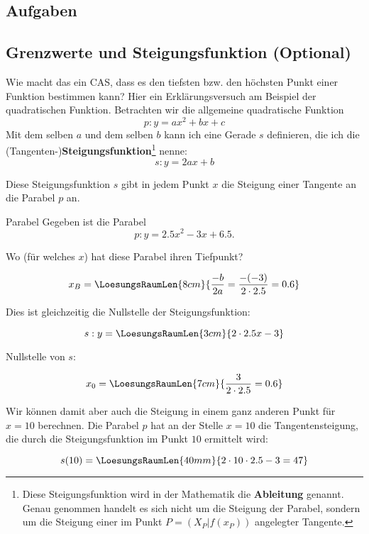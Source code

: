 
\subsection{Aufgaben}
\newpage


\subsection{Grenzwerte und Steigungsfunktion (Optional)}

Wie macht das ein CAS, dass es den tiefsten bzw. den höchsten Punkt
einer Funktion bestimmen kann? Hier ein Erklärungsversuch am Beispiel
der quadratischen Funktion.
Betrachten wir die allgemeine quadratische Funktion $$p: y=ax^2 + bx +
c$$
Mit dem selben $a$ und dem selben $b$ kann ich eine Gerade $s$
definieren, die ich die (Tangenten-)\textbf{Steigungsfunktion}\footnote{Diese
  Steigungsfunktion wird in der Mathematik die
  \textbf{Ableitung} genannt. Genau genommen handelt
  es sich nicht um die Steigung der Parabel, sondern um die Steigung
  einer im Punkt $P=(X_P|f(x_P))$ angelegter Tangente.} nenne:
$$s: y= 2ax+b$$
\newpage


Diese Steigungsfunktion $s$ gibt in jedem Punkt $x$ die Steigung einer
Tangente an die Parabel $p$ an.

\begin{beispiel}{Parabel}{}
  Gegeben ist die Parabel $$p: y=2.5x^2 - 3x + 6.5\text{.}$$

  Wo (für welches $x$) hat diese Parabel
  ihren Tiefpunkt? 

  $$x_B =   \LoesungsRaumLen{8cm}{\frac{-b}{2a} = \frac{-(-3)}{2\cdot{}2.5} = 0.6}$$

  Dies ist gleichzeitig die Nullstelle der
  Steigungsfunktion:

  $$s: y= \LoesungsRaumLen{3cm}{2\cdot{}2.5x - 3}$$

  Nullstelle von $s$:

  $$x_0 = \LoesungsRaumLen{7cm}{\frac{3}{2\cdot{}2.5} = 0.6}$$

  Wir können damit aber auch die Steigung in einem ganz anderen Punkt
  \zB für $x=10$ berechnen. Die Parabel $p$ hat an der Stelle $x=10$
  die Tangentensteigung, die durch die Steigungsfunktion im Punkt $10$
  ermittelt wird:

  $$s(10) = \LoesungsRaumLen{40mm}{2\cdot{}10\cdot{2.5} - 3 = 47}$$
  
\end{beispiel}
\newpage

